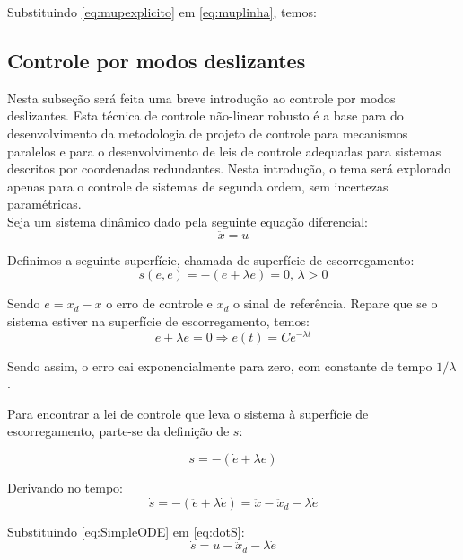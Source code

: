 \documentclass[a4paper,11pt,brazil,fleqn]{article}
\begin{document}
Substituindo \eqref{eq:mupexplicito} em \eqref{eq:muplinha}, temos:


\subsection{Controle por modos deslizantes}\label{S04-6}

Nesta subse\c{c}\~ao ser\'a feita uma breve introdu\c{c}\~ao ao controle por modos deslizantes. Esta t\'ecnica de controle n\~ao-linear robusto \'e a base para do desenvolvimento da metodologia de projeto de controle para mecanismos paralelos e para o desenvolvimento de leis de controle adequadas para sistemas descritos por coordenadas redundantes. Nesta introdu\c{c}\~ao, o tema ser\'a explorado apenas para o controle de sistemas de segunda ordem, sem incertezas param\'etricas. \\

Seja um sistema din\^amico dado pela seguinte equa\c{c}\~ao diferencial:
\begin{equation} \label{eq:SimpleODE}
\ddot{x} = u
\end{equation}

Definimos a seguinte superf\'icie, chamada de superf\'icie de escorregamento:
\begin{equation} \label{eq:SlidingSurface}
s(e, \dot{e}) = - (\dot{e} + \lambda e) = 0, \, \lambda > 0
\end{equation}

Sendo $e = x_d - x$ o erro de controle e $x_d$ o sinal de refer\^encia. Repare que se o sistema estiver na superf\'icie de escorregamento, temos:
\begin{equation} \label{eq:SlidingError}
\dot{e} + \lambda e = 0 \Rightarrow e(t) = C e^{- \lambda t}
\end{equation}

Sendo assim, o erro cai exponencialmente para zero, com constante de tempo $1/\lambda$.

Para encontrar a lei de controle que leva o sistema \`a superf\'icie de escorregamento, parte-se da defini\c{c}\~ao de $s$:

$$ s = -(\dot{e} + \lambda e) $$

Derivando no tempo:
\begin{equation} \label{eq:dotS}
\dot{s} =  -(\ddot{e} + \lambda \dot{e}) = \ddot{x} - \ddot{x}_d - \lambda \dot{e} 
\end{equation}

Substituindo \eqref{eq:SimpleODE} em \eqref{eq:dotS}:
\begin{equation} \label{dotS2}
\dot{s} = u - \ddot{x}_d - \lambda \dot{e}
\end{equation}
\end{document}
